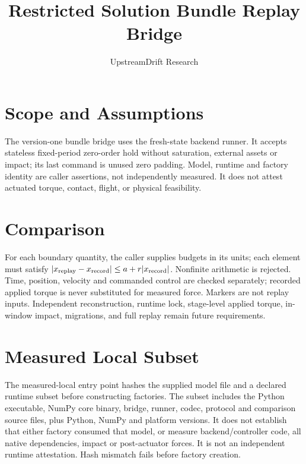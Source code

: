 \documentclass{article}
\title{Restricted Solution Bundle Replay Bridge}
\author{UpstreamDrift Research}
\date{}
\begin{document}
\maketitle
\section{Scope and Assumptions}
The version-one bundle bridge uses the fresh-state backend runner. It accepts
stateless fixed-period zero-order hold without saturation, external assets or
impact; its last command is unused zero padding. Model, runtime and factory
identity are caller assertions, not independently measured.
It does not attest actuated torque, contact, flight, or physical feasibility.
\section{Comparison}
For each boundary quantity, the caller supplies budgets in its units; each element must satisfy
\( |x_{\rm replay}-x_{\rm record}| \le a + r |x_{\rm record}| \).
Nonfinite arithmetic is rejected. Time, position, velocity and commanded
control are checked separately; recorded applied torque is never substituted
for measured force. Markers are not replay inputs. Independent reconstruction,
runtime lock, stage-level applied torque, in-window impact, migrations, and
full replay remain future requirements.
\section{Measured Local Subset}
The measured-local entry point hashes the supplied model file and a declared
runtime subset before constructing factories. The subset includes the Python
executable, NumPy core binary, bridge, runner, codec, protocol and comparison
source files, plus Python, NumPy and platform versions. It does not establish
that either factory consumed that model, or measure backend/controller code,
all native dependencies, impact or post-actuator forces. It is not an
independent runtime attestation. Hash mismatch fails before factory creation.
\end{document}
